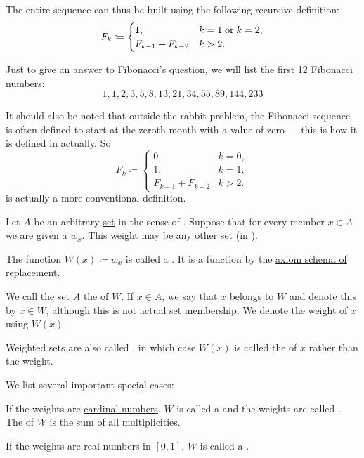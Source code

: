 \begin{example}
  The entire sequence can thus be built using the following recursive definition:
  \begin{equation*}
    F_k \coloneqq \begin{cases}
      1,                &k = 1 \T{or} k = 2, \\
      F_{k-1} + F_{k-2} &k > 2.
    \end{cases}
  \end{equation*}

  Just to give an answer to Fibonacci's question, we will list the first 12 Fibonacci numbers:
  \begin{equation*}
    1, 1, 2, 3, 5, 8, 13, 21, 34, 55, 89, 144, 233
  \end{equation*}

  It should also be noted that outside the rabbit problem, the Fibonacci sequence is often defined to start at the zeroth month with a value of zero --- this is how it is defined in  actually. So
  \begin{equation}\label{eq:ex:fibonacci_rabbits}
    F_k \coloneqq \begin{cases}
      0,                &k = 0, \\
      1,                &k = 1, \\
      F_{k-1} + F_{k-2} &k > 2.
    \end{cases}
  \end{equation}
  is actually a more conventional definition.
\end{example}

\begin{definition}\label{def:weighted_set}
  Let \( A \) be an arbitrary \hyperref[def:set]{set} in the sense of \hyperref[def:zfc]{}. Suppose that for every member \( x \in A \) we are given a  \( w_x \). This weight may be any other set (in ).

  The function \( W(x) \coloneqq w_x \) is called a . It is a function by the \hyperref[def:zfc/replacement]{axiom schema of replacement}.

  We call the set \( A \) the  of \( W \). If \( x \in A \), we say that \( x \) belongs to \( W \) and denote this by \( x \in W \), although this is not actual set membership. We denote the weight of \( x \) using \( W(x) \).

  Weighted sets are also called , in which case \( W(x) \) is called the  of \( x \) rather than the weight.

  We list several important special cases:
  \begin{thmenum}
     If the weights are \hyperref[def:cardinal]{cardinal numbers}, \( W \) is called a  and the weights are called . The  of \( W \) is the sum of all multiplicities.

     If the weights are real numbers in \( [0, 1] \), \( W \) is called a .
  \end{thmenum}
\end{definition}

